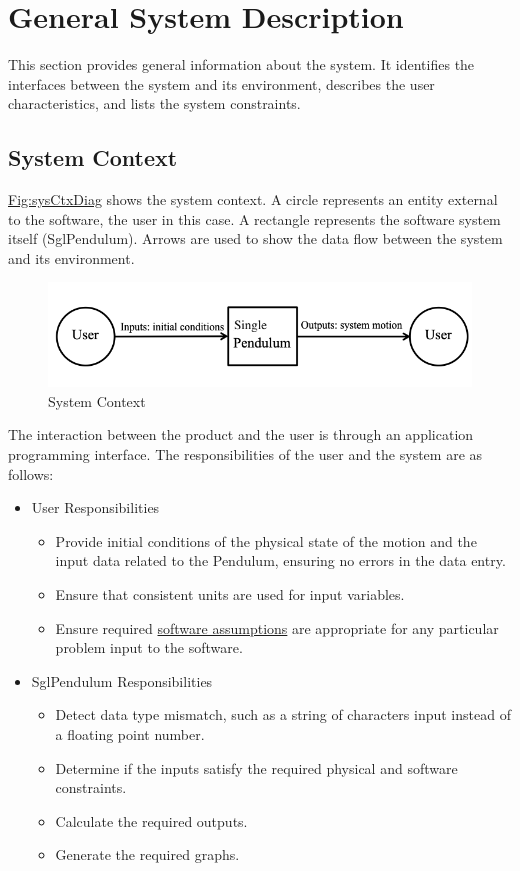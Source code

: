 \documentclass[12pt]{article}
\begin{document}
\section{General System Description}
\label{Sec:GenSysDesc}
This section provides general information about the system. It identifies the interfaces between the system and its environment, describes the user characteristics, and lists the system constraints.

\subsection{System Context}
\label{Sec:SysContext}
\hyperref[Figure:sysCtxDiag]{Fig:sysCtxDiag} shows the system context. A circle represents an entity external to the software, the user in this case. A rectangle represents the software system itself (SglPendulum). Arrows are used to show the data flow between the system and its environment.

\begin{figure}
\begin{center}
\includegraphics[width=\textwidth]{../../../../datafiles/sglpendulum/SystemContextFigure.png}
\caption{System Context}
\label{Figure:sysCtxDiag}
\end{center}
\end{figure}
The interaction between the product and the user is through an application programming interface. The responsibilities of the user and the system are as follows:

\begin{itemize}
\item{User Responsibilities}
\begin{itemize}
\item{Provide initial conditions of the physical state of the motion and the input data related to the Pendulum, ensuring no errors in the data entry.}
\item{Ensure that consistent units are used for input variables.}
\item{Ensure required \hyperref[Sec:Assumps]{software assumptions} are appropriate for any particular problem input to the software.}
\end{itemize}
\item{SglPendulum Responsibilities}
\begin{itemize}
\item{Detect data type mismatch, such as a string of characters input instead of a floating point number.}
\item{Determine if the inputs satisfy the required physical and software constraints.}
\item{Calculate the required outputs.}
\item{Generate the required graphs.}
\end{itemize}
\end{itemize}
\end{document}
